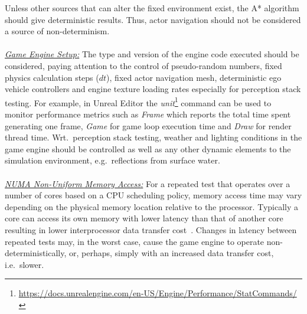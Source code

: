 \documentclass[letterpaper, 10 pt, journal, twoside]{IEEEtran}
\begin{document}
Unless other sources that can alter the fixed environment exist, the A* algorithm should give deterministic results. Thus, actor navigation should not be considered a source of non-determinism.
%
%
\\\\
\noindent\underline{\textit{Game Engine Setup:}}
The type and version of the engine code executed should be considered, paying attention to the control of pseudo-random numbers, fixed physics calculation steps ($dt$), fixed actor navigation mesh, deterministic ego vehicle controllers and engine texture loading rates especially for perception stack testing. %
For example, in Unreal Editor the \textit{unit}\footnote{\url{https://docs.unrealengine.com/en-US/Engine/Performance/StatCommands/}} command can be used to monitor performance metrics such as \textit{Frame} which reports 
the total time spent generating one frame, \textit{Game} for game loop execution time and \textit{Draw} for render thread time. 
%
Wrt.\ perception stack testing, weather and lighting conditions in the game engine should be controlled as well as any other dynamic elements to the simulation environment, e.g.\ reflections from surface water. 
\\\\
\noindent\underline{\textit{NUMA Non-Uniform Memory Access:}}
For a repeated test that operates over a number of cores based on a CPU scheduling policy, memory access time may vary depending on the physical memory location relative to the processor. Typically a core can access its own memory with lower latency than that of another core resulting in lower interprocessor data transfer cost~\cite{nieplocha1996global}. 
%
Changes in latency between repeated tests may, in the worst case, cause the game engine to operate non-deterministically, or, perhaps, simply with an increased data transfer cost, i.e.\ slower. 
\end{document}
